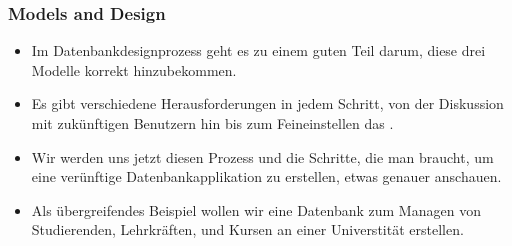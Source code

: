 \documentclass[aspectratio=169,mathserif,notheorems]{beamer}%
\begin{document}
%
\begin{frame}%
\frametitle{Models and Design}%
\begin{itemize}%
\item Im Datenbankdesignprozess geht es zu einem guten Teil darum, diese drei Modelle korrekt hinzubekommen.%
%
\item<2-> Es gibt verschiedene Herausforderungen in jedem Schritt, von der Diskussion mit zukünftigen Benutzern hin bis zum Feineinstellen das .%
%
\item<3-> Wir werden uns jetzt diesen Prozess und die Schritte, die man braucht, um eine verünftige Datenbankapplikation zu erstellen, etwas genauer anschauen.%
%
\item<4-> Als übergreifendes Beispiel wollen wir eine Datenbank zum Managen von Studierenden, Lehrkräften, und Kursen an einer Universtität erstellen.%
\end{itemize}%
\end{frame}%
%
\end{document}
